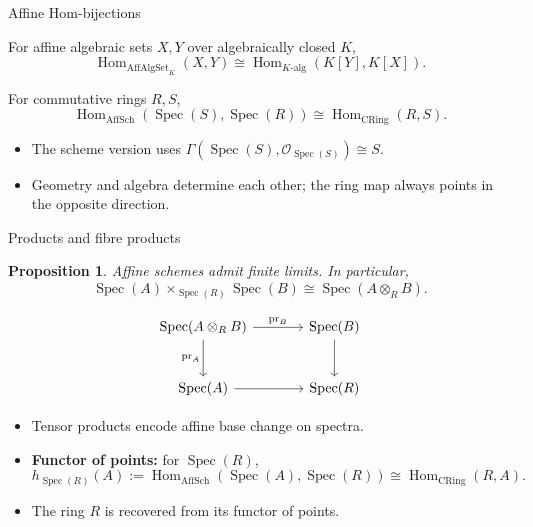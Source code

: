 \documentclass[10pt, aspectratio=169]{beamer}
\DeclareMathOperator{\Spec}{Spec}
\DeclareMathOperator{\Hom}{Hom}
\newcommand{\OO}{\mathcal{O}}
\newcommand{\AffAlgSetK}{\mathrm{AffAlgSet}_K}
\newcommand{\AffSch}{\mathrm{AffSch}}
\newcommand{\CRing}{\mathrm{CRing}}
\newtheorem{proposition}[theorem]{Proposition}
\begin{document}
\begin{frame}{Affine Hom-bijections}
    \begin{theorem}
        For affine algebraic sets $X, Y$ over algebraically closed $K$,
        \[
        \boxed{\Hom_{\AffAlgSetK}(X, Y) \cong \Hom_{K\text{-alg}}(K[Y], K[X]).}
        \]
    \end{theorem}
    \begin{theorem}
        For commutative rings $R, S$,
        \[
        \boxed{\Hom_{\AffSch}(\Spec(S), \Spec(R)) \cong \Hom_{\CRing}(R, S).}
        \]
    \end{theorem}
    \begin{itemize}
        \item The scheme version uses $\Gamma(\Spec(S),\OO_{\Spec(S)}) \cong S$.
        \item Geometry and algebra determine each other; the ring map always points in the opposite direction.
    \end{itemize}
\end{frame}

\begin{frame}[fragile]{Products and fibre products}
    \begin{proposition}
        Affine schemes admit finite limits. In particular,
        \[
        \boxed{\Spec(A)\times_{\Spec(R)}\Spec(B)\cong \Spec(A\otimes_R B).}
        \]
    \end{proposition}
    \[
    \begin{tikzcd}[column sep=large, row sep=large]
        \Spec(A\otimes_R B) \arrow[r, "\mathrm{pr}_B"] \arrow[d, "\mathrm{pr}_A"'] & \Spec(B) \arrow[d] \\
        \Spec(A) \arrow[r] & \Spec(R)
    \end{tikzcd}
    \]
    \begin{itemize}
        \item Tensor products encode affine base change on spectra.
        \item \textbf{Functor of points:} for $\Spec(R)$,
        \[
        h_{\Spec(R)}(A) := \Hom_{\AffSch}(\Spec(A),\Spec(R)) \cong \Hom_{\CRing}(R,A).
        \]
        \item The ring $R$ is recovered from its functor of points.
    \end{itemize}
\end{frame}

\end{document}
